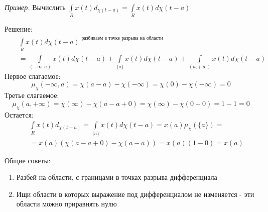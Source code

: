 \documentclass{article}[12pt]
\begin{document}
\par \textit{Пример.} Вычислить
$\int\limits_{R}x(t)d_{\chi(t-a)}=\int\limits_{R}x(t)d\chi(t-a)$
\par Решение:
\begin{eqnarray*}
&&\int\limits_{R}x(t)d\chi(t-a)\stackrel{\text{разбиваем в точке разрыва на области}}{=}
\\&&=\int\limits_{(-\infty;a)}x(t)d\chi(t-a)+\int\limits_{\{a\}}x(t)d\chi(t-a)
+\int\limits_{(a;+\infty)}x(t)d\chi(t-a)
\end{eqnarray*}
Первое слагаемое:
\begin{displaymath}
    \mu_{\chi}(-\infty,a)=\chi(a-a)-\chi(-\infty)=\chi(0)-\chi(-\infty)=0
\end{displaymath}
Третье слагаемое:
\begin{displaymath}
    \mu_{\chi}(a,+\infty)=\chi(\infty)-\chi(a-a+0)=\chi(\infty)-\chi(0+0)=1-1=0
\end{displaymath}
Остается:
\begin{eqnarray*}
    &&\int\limits_{R}x(t)d_{\chi(t-a)}=\int\limits_{\{a\}}x(t)d\chi(t-a)=x(a)\mu_{\chi}(\{a\})
    =\\&&=x(a)\left(\chi(a-a+0)-\chi(a-a)\right)=x(a)(1-0)=x(a)
\end{eqnarray*}





\par Общие советы:
\begin{enumerate}
    \item Разбей на области, с границами в точках разрыва дифференциала
    \item Ищи области в которых выражение под дифференциалом не
        изменяется - эти области можно приравнять нулю
\end{enumerate}
\end{document}

